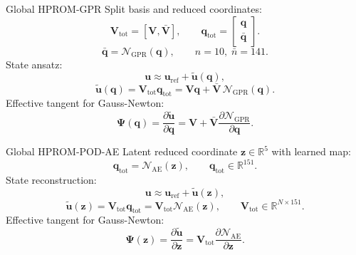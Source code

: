 \documentclass{beamer}
\begin{document}
\begin{frame}{Global HPROM-GPR}
\small
Split basis and reduced coordinates:
\[
\mathbf{V}_{\mathrm{tot}}=[\mathbf{V},\bar{\mathbf{V}}],
\qquad
\mathbf{q}_{\mathrm{tot}}=
\begin{bmatrix}
\mathbf{q}\\
\bar{\mathbf{q}}
\end{bmatrix}.
\]
\[
\bar{\mathbf{q}}=\mathcal{N}_{\mathrm{GPR}}(\mathbf{q}),
\qquad
n=10,\;\bar{n}=141.
\]
State ansatz:
\[
\mathbf{u}\approx
\mathbf{u}_{\mathrm{ref}}
+\widetilde{\mathbf{u}}(\mathbf{q}),
\]
\[
\widetilde{\mathbf{u}}(\mathbf{q})
=\mathbf{V}_{\mathrm{tot}}\mathbf{q}_{\mathrm{tot}}
=\mathbf{V}\mathbf{q}
+\bar{\mathbf{V}}\,\mathcal{N}_{\mathrm{GPR}}(\mathbf{q}).
\]
Effective tangent for Gauss-Newton:
\[
\mathbf{\Psi}(\mathbf{q})
=\frac{\partial\widetilde{\mathbf{u}}}{\partial\mathbf{q}}
=\mathbf{V}
+\bar{\mathbf{V}}\frac{\partial\mathcal{N}_{\mathrm{GPR}}}{\partial\mathbf{q}}.
\]
\end{frame}

\begin{frame}{Global HPROM-POD-AE}
\small
Latent reduced coordinate $\mathbf{z}\in\mathbb{R}^{5}$ with learned map:
\[
\mathbf{q}_{\mathrm{tot}}=\mathcal{N}_{\mathrm{AE}}(\mathbf{z}),
\qquad
\mathbf{q}_{\mathrm{tot}}\in\mathbb{R}^{151}.
\]
State reconstruction:
\[
\mathbf{u}\approx
\mathbf{u}_{\mathrm{ref}}
+\widetilde{\mathbf{u}}(\mathbf{z}),
\]
\[
\widetilde{\mathbf{u}}(\mathbf{z})
=\mathbf{V}_{\mathrm{tot}}\mathbf{q}_{\mathrm{tot}}
=\mathbf{V}_{\mathrm{tot}}\mathcal{N}_{\mathrm{AE}}(\mathbf{z}),
\qquad
\mathbf{V}_{\mathrm{tot}}\in\mathbb{R}^{N\times 151}.
\]
Effective tangent for Gauss-Newton:
\[
\mathbf{\Psi}(\mathbf{z})
=\frac{\partial\widetilde{\mathbf{u}}}{\partial\mathbf{z}}
=\mathbf{V}_{\mathrm{tot}}
\frac{\partial\mathcal{N}_{\mathrm{AE}}}{\partial\mathbf{z}}.
\]
\end{frame}
\end{document}
